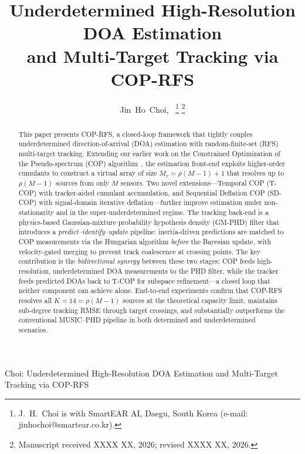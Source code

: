 \documentclass[journal]{IEEEtran}
\begin{document}
\title{Underdetermined High-Resolution DOA Estimation\\and Multi-Target Tracking via COP-RFS}

\author{Jin~Ho~Choi,~
\thanks{J.~H.~Choi is with SmartEAR AI, Daegu, South Korea (e-mail: jinhochoi@smartear.co.kr).}
\thanks{Manuscript received XXXX XX, 2026; revised XXXX XX, 2026.}}

{Choi: Underdetermined High-Resolution DOA Estimation and Multi-Target Tracking via COP-RFS}

\maketitle

\begin{abstract}
This paper presents COP-RFS, a closed-loop framework that tightly couples underdetermined direction-of-arrival (DOA) estimation with random-finite-set (RFS) multi-target tracking. Extending our earlier work on the Constrained Optimization of the Pseudo-spectrum (COP) algorithm~\cite{choi2015underdetermined}, the estimation front-end exploits higher-order cumulants to construct a virtual array of size $M_v=\rho(M{-}1){+}1$ that resolves up to $\rho(M{-}1)$ sources from only $M$ sensors. Two novel extensions---Temporal COP (T-COP) with tracker-aided cumulant accumulation, and Sequential Deflation COP (SD-COP) with signal-domain iterative deflation---further improve estimation under non-stationarity and in the super-underdetermined regime. The tracking back-end is a physics-based Gaussian-mixture probability hypothesis density (GM-PHD) filter that introduces a \emph{predict--identify--update} pipeline: inertia-driven predictions are matched to COP measurements via the Hungarian algorithm \emph{before} the Bayesian update, with velocity-gated merging to prevent track coalescence at crossing points. The key contribution is the \emph{bidirectional synergy} between these two stages: COP feeds high-resolution, underdetermined DOA measurements to the PHD filter, while the tracker feeds predicted DOAs back to T-COP for subspace refinement---a closed loop that neither component can achieve alone. End-to-end experiments confirm that COP-RFS resolves all $K{=}14{=}\rho(M{-}1)$ sources at the theoretical capacity limit, maintains sub-degree tracking RMSE through target crossings, and substantially outperforms the conventional MUSIC--PHD pipeline in both determined and underdetermined scenarios.
\end{abstract}
\end{document}
